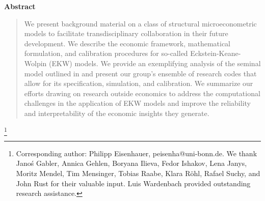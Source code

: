 
\maketitle


\vspace{0.5cm}
\renewcommand{\baselinestretch}{1.3}\normalsize

\setcounter{page}{1}
\thispagestyle{empty}

\begin{center}\textbf{Abstract}\end{center}
\begin{abstract}
\noindent We present background material on a class of structural microeconometric models to facilitate transdisciplinary collaboration in their future development. We describe the economic framework, mathematical formulation, and calibration procedures for so-called Eckstein-Keane-Wolpin (EKW) models. We provide an exemplifying analysis of the seminal model outlined in \citet{Keane.1997} and present our group's ensemble of research codes that allow for its specification, simulation, and calibration. We summarize our efforts drawing on research outside economics to address the computational challenges in the application of EKW models and improve the reliability and interpretability of the economic insights they generate.
\end{abstract}

\let\thefootnote\relax\footnote{Corresponding author: Philipp Eisenhauer, peisenha@uni-bonn.de. We thank  Jano\'s Gabler, Annica Gehlen, Boryana Ilieva, Fedor Ishakov, Lena Janys, Moritz Mendel, Tim Mensinger, Tobias Raabe, Klara R\"ohl, Rafael Suchy, and John Rust for their valuable input. Luis Wardenbach provided outstanding research assistance.}

\setcounter{page}{1}
\thispagestyle{empty}

\newpage
\tableofcontents
\newpage
